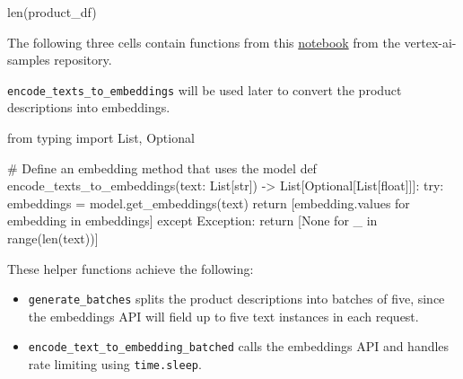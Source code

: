 \documentclass[
  letterpaper,
  DIV=11,
  numbers=noendperiod]{scrreprt}
\newenvironment{Shaded}{\begin{snugshade}}{\end{snugshade}}
\newcommand{\BuiltInTok}[1]{\textcolor[rgb]{0.00,0.23,0.31}{#1}}
\newcommand{\CommentTok}[1]{\textcolor[rgb]{0.37,0.37,0.37}{#1}}
\newcommand{\ControlFlowTok}[1]{\textcolor[rgb]{0.00,0.23,0.31}{#1}}
\newcommand{\ImportTok}[1]{\textcolor[rgb]{0.00,0.46,0.62}{#1}}
\newcommand{\KeywordTok}[1]{\textcolor[rgb]{0.00,0.23,0.31}{#1}}
\newcommand{\NormalTok}[1]{\textcolor[rgb]{0.00,0.23,0.31}{#1}}
\newcommand{\OperatorTok}[1]{\textcolor[rgb]{0.37,0.37,0.37}{#1}}
\newcommand{\PreprocessorTok}[1]{\textcolor[rgb]{0.68,0.00,0.00}{#1}}
\newcommand{\VariableTok}[1]{\textcolor[rgb]{0.07,0.07,0.07}{#1}}
\begin{document}
\begin{Shaded}
\begin{Highlighting}[]
\BuiltInTok{len}\NormalTok{(product\_df)}
\end{Highlighting}
\end{Shaded}

The following three cells contain functions from this
\href{https://github.com/GoogleCloudPlatform/vertex-ai-samples/blob/main/notebooks/official/matching_engine/sdk_matching_engine_create_stack_overflow_embeddings_vertex.ipynb}{notebook}
from the vertex-ai-samples repository.

\texttt{encode\_texts\_to\_embeddings} will be used later to convert the
product descriptions into embeddings.

\begin{Shaded}
\begin{Highlighting}[]
\ImportTok{from}\NormalTok{ typing }\ImportTok{import}\NormalTok{ List, Optional}

\CommentTok{\# Define an embedding method that uses the model}
\KeywordTok{def}\NormalTok{ encode\_texts\_to\_embeddings(text: List[}\BuiltInTok{str}\NormalTok{]) }\OperatorTok{{-}\textgreater{}}\NormalTok{ List[Optional[List[}\BuiltInTok{float}\NormalTok{]]]:}
    \ControlFlowTok{try}\NormalTok{:}
\NormalTok{        embeddings }\OperatorTok{=}\NormalTok{ model.get\_embeddings(text)}
        \ControlFlowTok{return}\NormalTok{ [embedding.values }\ControlFlowTok{for}\NormalTok{ embedding }\KeywordTok{in}\NormalTok{ embeddings]}
    \ControlFlowTok{except} \PreprocessorTok{Exception}\NormalTok{:}
        \ControlFlowTok{return}\NormalTok{ [}\VariableTok{None} \ControlFlowTok{for}\NormalTok{ \_ }\KeywordTok{in} \BuiltInTok{range}\NormalTok{(}\BuiltInTok{len}\NormalTok{(text))]}
\end{Highlighting}
\end{Shaded}

These helper functions achieve the following:

\begin{itemize}
\item
  \texttt{generate\_batches} splits the product descriptions into
  batches of five, since the embeddings API will field up to five text
  instances in each request.
\item
  \texttt{encode\_text\_to\_embedding\_batched} calls the embeddings API
  and handles rate limiting using \texttt{time.sleep}.
\end{itemize}
\end{document}
